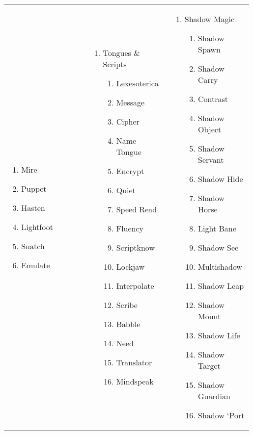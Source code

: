 \begin{tabular}{@{} p{0.33\linewidth} p{0.33\linewidth} p{0.33\linewidth}}
\begin{enumerate}
\begin{enumerate}
		\item Mire
		\item Puppet
		\item Hasten
		\item Lightfoot
		\item Snatch
		\item Emulate
	\end{enumerate}
\end{enumerate} &
\begin{enumerate}
	\item Tongues \& Scripts
	\begin{enumerate}
		\item Lexesoterica
		\item Message
		\item Cipher
		\item Name Tongue
		\item Encrypt
		\item Quiet
		\item Speed Read
		\item Fluency
		\item Scriptknow
		\item Lockjaw
		\item Interpolate
		\item Scribe
		\item Babble
		\item Need
		\item Translator
		\item Mindspeak
	\end{enumerate}
\end{enumerate} &
\begin{enumerate}
	\item Shadow Magic
	\begin{enumerate}
		\item Shadow Spawn
		\item Shadow Carry
		\item Contrast
		\item Shadow Object
		\item Shadow Servant
		\item Shadow Hide
		\item Shadow Horse
		\item Light Bane
		\item Shadow See
		\item Multishadow
		\item Shadow Leap
		\item Shadow Mount
		\item Shadow Life
		\item Shadow Target
		\item Shadow Guardian
		\item Shadow ‘Port
	\end{enumerate}
\end{enumerate}
\end{tabular}

